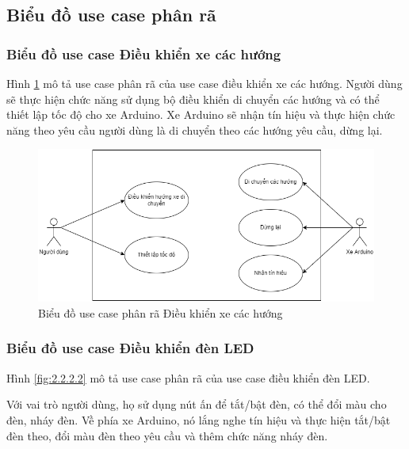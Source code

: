 \documentclass[../DoAn.tex]{subfiles}
\begin{document}
\subsection{Biểu đồ use case phân rã}
\label{subsection:2.2.2}

\subsubsection{Biểu đồ use case Điều khiển xe các hướng}
\label{subsection:2.2.2.1}

Hình \ref{fig:2.2.2.1} mô tả use case phân rã của use case điều khiển xe các hướng. Người dùng sẽ thực hiện chức năng sử dụng bộ điều khiển di chuyển các hướng và có thể thiết lập tốc độ cho xe Arduino. Xe Arduino sẽ nhận tín hiệu và thực hiện chức năng theo yêu cầu người dùng là di chuyển theo các hướng yêu cầu, dừng lại.

\begin{figure}[H]
    \includegraphics[scale = 0.6]{Hinhve/usecase_phan_ra_dieu_khien_xe.png}
    \centering
    \caption{Biểu đồ use case phân rã Điều khiển xe các hướng}
    \label{fig:2.2.2.1}
\end{figure}

\subsubsection{Biểu đồ use case Điều khiển đèn LED}
\label{subsection:2.2.2.2}

Hình \ref{fig:2.2.2.2} mô tả use case phân rã của use case điều khiển đèn LED. 

Với vai trò người dùng, họ sử dụng nút ấn để tắt/bật đèn, có thể đổi màu cho đèn, nháy đèn. Về phía xe Arduino, nó lắng nghe tín hiệu và thực hiện tắt/bật đèn theo, đổi màu đèn theo yêu cầu và thêm chức năng nháy đèn.
\end{document}
